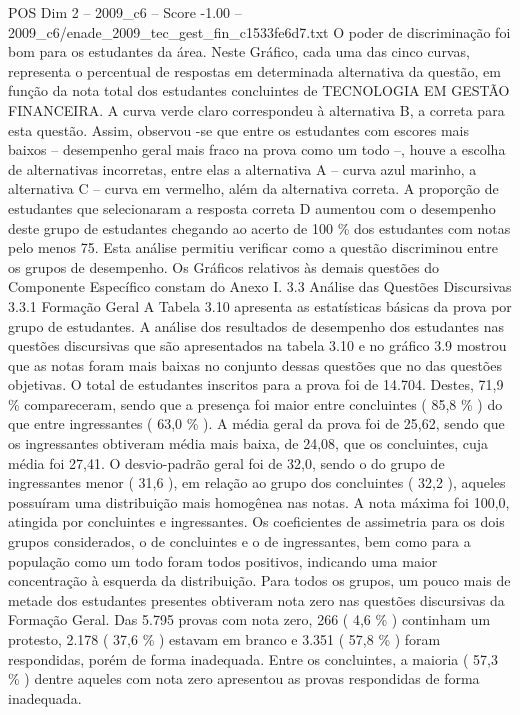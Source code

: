 \begin{textsample}{POS Dim 2 – 2009\_c6 – Score -1.00 – 2009\_c6/enade\_2009\_tec\_gest\_fin\_c1533fe6d7.txt}
O poder de discriminação foi bom para os estudantes da área.
Neste Gráfico, cada uma das cinco curvas, representa o percentual de respostas em determinada alternativa da questão, em função da nota total dos estudantes concluintes de TECNOLOGIA EM GESTÃO FINANCEIRA.
A curva verde claro correspondeu à alternativa B, a correta para esta questão.
Assim, observou -se que entre os estudantes com escores mais baixos – desempenho geral mais fraco na prova como um todo –, houve a escolha de alternativas incorretas, entre elas a alternativa A – curva azul marinho, a alternativa C – curva em vermelho, além da alternativa correta.
A proporção de estudantes que selecionaram a resposta correta D aumentou com o desempenho deste grupo de estudantes chegando ao acerto de 100 \% dos estudantes com notas pelo menos 75.
Esta análise permitiu verificar como a questão discriminou entre os grupos de desempenho.
Os Gráficos relativos às demais questões do Componente Específico constam do Anexo I. 3.3 Análise das Questões Discursivas 3.3.1 Formação Geral A Tabela 3.10 apresenta as estatísticas básicas da prova por grupo de estudantes.
A análise dos resultados de desempenho dos estudantes nas questões discursivas que são apresentados na tabela 3.10 e no gráfico 3.9 mostrou que as notas foram mais baixas no conjunto dessas questões que no das questões objetivas.
O total de estudantes inscritos para a prova foi de 14.704.
Destes, 71,9 \% compareceram, sendo que a presença foi maior entre concluintes ( 85,8 \% ) do que entre ingressantes ( 63,0 \% ).
A média geral da prova foi de 25,62, sendo que os ingressantes obtiveram média mais baixa, de 24,08, que os concluintes, cuja média foi 27,41.
O desvio-padrão geral foi de 32,0, sendo o do grupo de ingressantes menor ( 31,6 ), em relação ao grupo dos concluintes ( 32,2 ), aqueles possuíram uma distribuição mais homogênea nas notas.
A nota máxima foi 100,0, atingida por concluintes e ingressantes.
Os coeficientes de assimetria para os dois grupos considerados, o de concluintes e o de ingressantes, bem como para a população como um todo foram todos positivos, indicando uma maior concentração à esquerda da distribuição.
Para todos os grupos, um pouco mais de metade dos estudantes presentes obtiveram nota zero nas questões discursivas da Formação Geral.
Das 5.795 provas com nota zero, 266 ( 4,6 \% ) continham um protesto, 2.178 ( 37,6 \% ) estavam em branco e 3.351 ( 57,8 \% ) foram respondidas, porém de forma inadequada.
Entre os concluintes, a maioria ( 57,3 \% ) dentre aqueles com nota zero apresentou as provas respondidas de forma inadequada.

\end{textsample}
